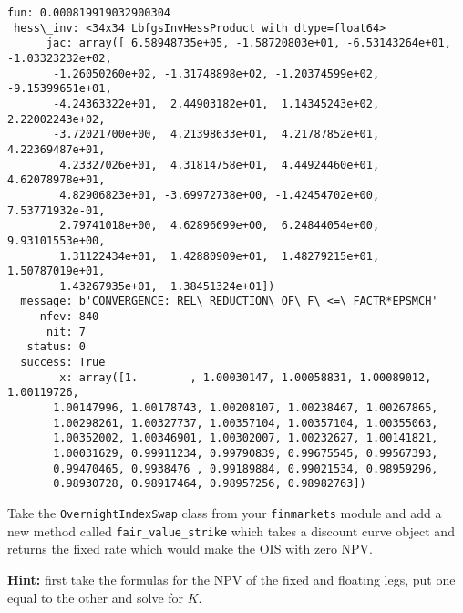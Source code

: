 \begin{Answer}
\begin{codebox}[breakable, size=fbox, boxrule=1pt, pad at break*=1mm,colback=cellbackground, colframe=cellborder]
\begin{Verbatim}[commandchars=\\\{\}]
      fun: 0.000819919032900304
 hess\_inv: <34x34 LbfgsInvHessProduct with dtype=float64>
      jac: array([ 6.58948735e+05, -1.58720803e+01, -6.53143264e+01,
-1.03323232e+02,
       -1.26050260e+02, -1.31748898e+02, -1.20374599e+02, -9.15399651e+01,
       -4.24363322e+01,  2.44903182e+01,  1.14345243e+02,  2.22002243e+02,
       -3.72021700e+00,  4.21398633e+01,  4.21787852e+01,  4.22369487e+01,
        4.23327026e+01,  4.31814758e+01,  4.44924460e+01,  4.62078978e+01,
        4.82906823e+01, -3.69972738e+00, -1.42454702e+00,  7.53771932e-01,
        2.79741018e+00,  4.62896699e+00,  6.24844054e+00,  9.93101553e+00,
        1.31122434e+01,  1.42880909e+01,  1.48279215e+01,  1.50787019e+01,
        1.43267935e+01,  1.38451324e+01])
  message: b'CONVERGENCE: REL\_REDUCTION\_OF\_F\_<=\_FACTR*EPSMCH'
     nfev: 840
      nit: 7
   status: 0
  success: True
        x: array([1.        , 1.00030147, 1.00058831, 1.00089012, 1.00119726,
       1.00147996, 1.00178743, 1.00208107, 1.00238467, 1.00267865,
       1.00298261, 1.00327737, 1.00357104, 1.00357104, 1.00355063,
       1.00352002, 1.00346901, 1.00302007, 1.00232627, 1.00141821,
       1.00031629, 0.99911234, 0.99790839, 0.99675545, 0.99567393,
       0.99470465, 0.9938476 , 0.99189884, 0.99021534, 0.98959296,
       0.98930728, 0.98917464, 0.98957256, 0.98982763])
\end{Verbatim}
\end{codebox}
\end{Answer}

\begin{Exercise}[title={(OvernightIndexSwap fair value)}]
Take the \texttt{OvernightIndexSwap} class from your \texttt{finmarkets} module and add a new method called \texttt{fair\_value\_strike} which takes a discount curve object and returns the fixed rate which would make the OIS with zero NPV.

\textbf{Hint:} first take the formulas for the NPV of the fixed and floating legs, put one equal to the other and solve for $K$.
\end{Exercise}

